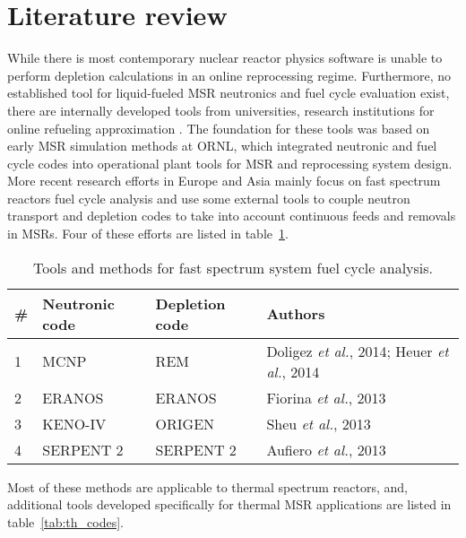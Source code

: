 \section{Literature review}
While there is most contemporary nuclear reactor physics software is unable to perform depletion calculations in an online reprocessing regime. Furthermore, no established tool for liquid-fueled \gls{MSR} neutronics and fuel cycle evaluation exist, there are internally developed tools from universities, research institutions for online refueling approximation \cite{serp_molten_2014}. The foundation for these tools was based on early \gls{MSR} simulation methods at \gls{ORNL}, which integrated neutronic and fuel cycle codes \cite{bauman_rod:_1971} into operational plant tools \cite{kee_mrpp:_1976} for \gls{MSR} and reprocessing system design. More recent research efforts in Europe and Asia mainly focus on fast spectrum reactors fuel cycle analysis and use some external tools to couple neutron transport and depletion codes to take into account continuous feeds and removals in \glspl{MSR}. Four of these efforts are listed in table~\ref{tab:fs_codes}.

\begin{table}[h!]
\centering
\caption{Tools and methods for fast spectrum system fuel cycle analysis.}
\begin{tabular}{ |m{}|m{}|m{}|m{}|} 
\hline
\# & Neutronic code  & Depletion code    & Authors         \\[5pt]
\hline
1 & \gls{MCNP} \cite{noauthor_mcnp_2004}      & REM \cite{heuer_simulation_2010}  & Doligez \emph{et al.}, 2014; Heuer \emph{et al.}, 2014 \cite{doligez_coupled_2014,heuer_towards_2014}    \\[5pt]
\hline
2 & ERANOS \cite{ruggieri_eranos_2006}      & ERANOS     & Fiorina \emph{et al.}, 2013 \cite{fiorina_investigation_2013}\\[5pt]
\hline
3 & KENO-IV \cite{goluoglu_monte_2011}     & ORIGEN \cite{gauld_isotopic_2011}     & Sheu \emph{et al.}, 2013 \cite{sheu_depletion_2013} \\[5pt]
\hline
4 & SERPENT 2 \cite{leppanen_serpent_2015}   & SERPENT 2  & Aufiero \emph{et al.}, 2013 \cite{aufiero_extended_2013} \\[5pt]
\hline
\end{tabular}
  \label{tab:fs_codes}
\end{table}

Most of these methods are applicable to thermal spectrum reactors, and, additional tools developed specifically for thermal \gls{MSR} applications are listed in table~\ref{tab:th_codes}.

